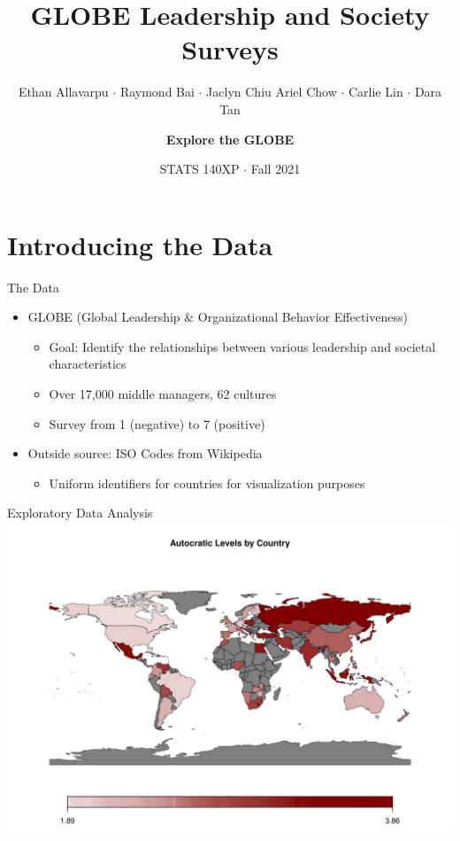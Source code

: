 \documentclass[
  ignorenonframetext,
]{beamer}
\title{GLOBE Leadership and Society Surveys}
\subtitle{Ethan Allavarpu \(\cdot\) Raymond Bai \(\cdot\) Jaclyn Chiu
\newline Ariel Chow \(\cdot\) Carlie Lin \(\cdot\) Dara Tan}
\author{\textbf{Explore the GLOBE}}
\date{STATS 140XP \(\cdot\) Fall 2021}
\providecommand{\tightlist}{%
  \setlength{\itemsep}{0pt}\setlength{\parskip}{0pt}}
\begin{document}
\frame{\titlepage}

\hypertarget{introducing-the-data}{%
\section{Introducing the Data}\label{introducing-the-data}}

\begin{frame}{The Data}
\protect\hypertarget{the-data}{}
\begin{itemize}
\tightlist
\item
  GLOBE (Global Leadership \& Organizational Behavior Effectiveness)

  \begin{itemize}
  \tightlist
  \item
    Goal: Identify the relationships between various leadership and
    societal characteristics
  \item
    Over 17,000 middle managers, 62 cultures
  \item
    Survey from 1 (negative) to 7 (positive)
  \end{itemize}
\item
  Outside source: ISO Codes from Wikipedia

  \begin{itemize}
  \tightlist
  \item
    Uniform identifiers for countries for visualization purposes
  \end{itemize}
\end{itemize}
\end{frame}

\begin{frame}{Exploratory Data Analysis}
\protect\hypertarget{exploratory-data-analysis}{}
\includegraphics{final_slides_files/figure-beamer/eda_leader-1.pdf}
\end{frame}
\end{document}

